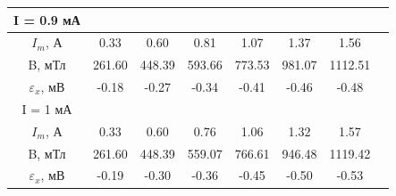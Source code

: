 \documentclass [a4paper,12pt]{article}
\begin{document}
\begin{table}[H]
\begin{center}
\begin{tabular}{|c|c|c|c|c|c|c|c|}
\hline
I = 0.9 мА&&&&&&\\
\hline
$I_m$, А & 0.33 & 0.60 & 0.81 & 1.07 & 1.37 & 1.56\\
\hline
B, мТл & 261.60 & 448.39 & 593.66 & 773.53 & 981.07 & 1112.51 \\ 
\hline
$\varepsilon_x$, мВ & -0.18 & -0.27 & -0.34 & -0.41 & -0.46 & -0.48 \\ 
\hline
I = 1 мА&&&&&&\\
\hline
$I_m$, А & 0.33 & 0.60 & 0.76 & 1.06 & 1.32 & 1.57 \\ 
\hline
B, мТл & 261.60 & 448.39 & 559.07 & 766.61 & 946.48 & 1119.42\\ 
\hline
$\varepsilon_x$, мВ & -0.19 & -0.30 & -0.36 & -0.45 & -0.50 & -0.53 \\ 
\hline
\end{tabular}
\end{center}
\label{table1:ref}
\end{table}
\end{document}
